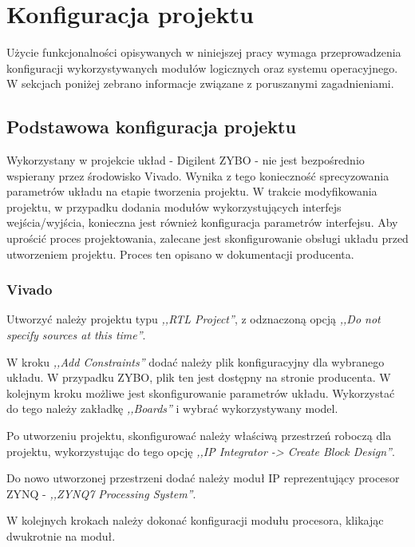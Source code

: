 \chapter{Konfiguracja projektu}
\label{cha:vivado-conf}

Użycie funkcjonalności opisywanych w niniejszej pracy wymaga przeprowadzenia konfiguracji wykorzystywanych modułów logicznych oraz systemu operacyjnego. W sekcjach poniżej zebrano informacje związane z poruszanymi zagadnieniami.

\section{Podstawowa konfiguracja projektu}

Wykorzystany w projekcie układ - Digilent ZYBO - nie jest bezpośrednio wspierany przez środowisko Vivado. Wynika z tego konieczność sprecyzowania parametrów układu na etapie tworzenia projektu. W trakcie modyfikowania projektu, w przypadku dodania modułów wykorzystujących interfejs wejścia/wyjścia, konieczna jest również konfiguracja parametrów interfejsu. Aby uprościć proces projektowania, zalecane jest skonfigurowanie obsługi układu przed utworzeniem projektu. Proces ten opisano w dokumentacji producenta. \cite{zybo-in-vivado}

\subsection{Vivado}
\label{sec:vivado-conf}
Utworzyć należy projektu typu \emph{,,RTL Project''}, z odznaczoną opcją \emph{,,Do not specify sources at this time''}.

W kroku \emph{,,Add Constraints''} dodać należy plik konfiguracyjny dla wybranego układu. W przypadku ZYBO, plik ten jest dostępny na stronie producenta. W kolejnym kroku możliwe jest skonfigurowanie parametrów układu. Wykorzystać do tego należy zakładkę \emph{,,Boards''} i wybrać wykorzystywany model.

Po utworzeniu projektu, skonfigurować należy właściwą przestrzeń roboczą dla projektu, wykorzystując do tego opcję \emph{,,IP Integrator -> Create Block Design''}.

Do nowo utworzonej przestrzeni dodać należy moduł IP reprezentujący procesor ZYNQ - \emph{,,ZYNQ7 Processing System''}.

W kolejnych krokach należy dokonać konfiguracji modułu procesora, klikając dwukrotnie na moduł.

